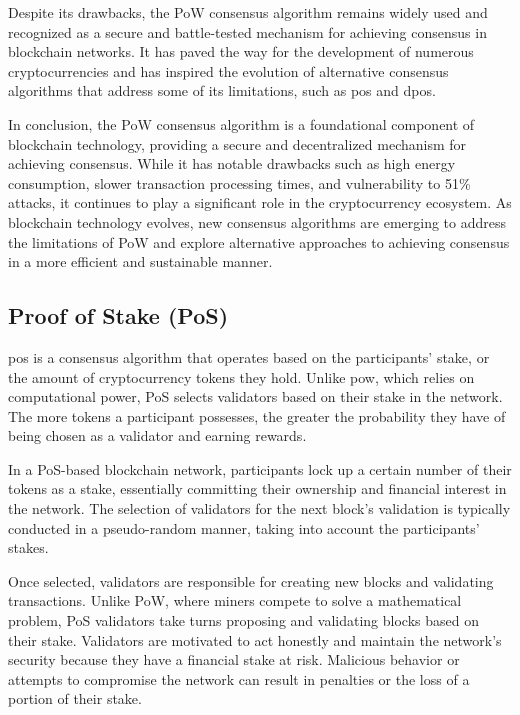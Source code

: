 Despite its drawbacks, the PoW consensus algorithm remains widely used and recognized as a secure and battle-tested mechanism for achieving consensus in blockchain networks. It has paved the way for the development of numerous cryptocurrencies and has inspired the evolution of alternative consensus algorithms that address some of its limitations, such as \gls{pos} and \gls{dpos}.

In conclusion, the PoW consensus algorithm is a foundational component of blockchain technology, providing a secure and decentralized mechanism for achieving consensus. While it has notable drawbacks such as high energy consumption, slower transaction processing times, and vulnerability to 51\% attacks, it continues to play a significant role in the cryptocurrency ecosystem. As blockchain technology evolves, new consensus algorithms are emerging to address the limitations of PoW and explore alternative approaches to achieving consensus in a more efficient and sustainable manner.

\subsection{Proof of Stake (PoS)}

\gls{pos} is a consensus algorithm that operates based on the participants' stake, or the amount of cryptocurrency tokens they hold. Unlike \gls{pow}, which relies on computational power, PoS selects validators based on their stake in the network. The more tokens a participant possesses, the greater the probability they have of being chosen as a validator and earning rewards.

In a PoS-based blockchain network, participants lock up a certain number of their tokens as a stake, essentially committing their ownership and financial interest in the network. The selection of validators for the next block's validation is typically conducted in a pseudo-random manner, taking into account the participants' stakes.

Once selected, validators are responsible for creating new blocks and validating transactions. Unlike PoW, where miners compete to solve a mathematical problem, PoS validators take turns proposing and validating blocks based on their stake. Validators are motivated to act honestly and maintain the network's security because they have a financial stake at risk. Malicious behavior or attempts to compromise the network can result in penalties or the loss of a portion of their stake.

